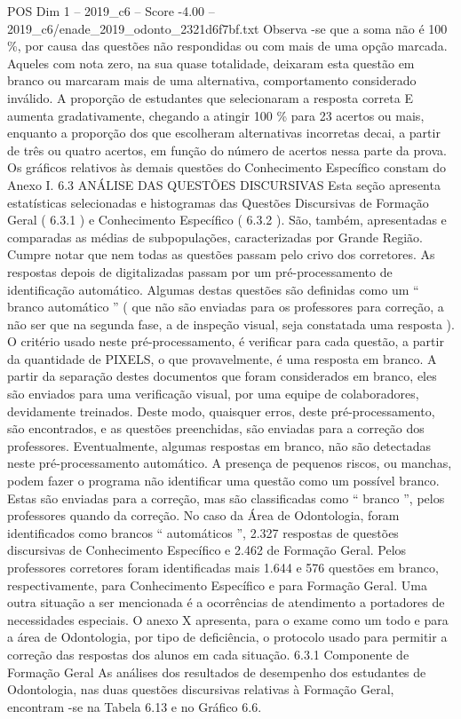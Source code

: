 \begin{textsample}{POS Dim 1 – 2019\_c6 – Score -4.00 – 2019\_c6/enade\_2019\_odonto\_2321d6f7bf.txt}
Observa -se que a soma não é 100 \%, por causa das questões não respondidas ou com mais de uma opção marcada.
Aqueles com nota zero, na sua quase totalidade, deixaram esta questão em branco ou marcaram mais de uma alternativa, comportamento considerado inválido.
A proporção de estudantes que selecionaram a resposta correta E aumenta gradativamente, chegando a atingir 100 \% para 23 acertos ou mais, enquanto a proporção dos que escolheram alternativas incorretas decai, a partir de três ou quatro acertos, em função do número de acertos nessa parte da prova.
Os gráficos relativos às demais questões do Conhecimento Específico constam do Anexo I. 6.3 ANÁLISE DAS QUESTÕES DISCURSIVAS Esta seção apresenta estatísticas selecionadas e histogramas das Questões Discursivas de Formação Geral ( 6.3.1 ) e Conhecimento Específico ( 6.3.2 ).
São, também, apresentadas e comparadas as médias de subpopulações, caracterizadas por Grande Região.
Cumpre notar que nem todas as questões passam pelo crivo dos corretores.
As respostas depois de digitalizadas passam por um pré-processamento de identificação automático.
Algumas destas questões são definidas como um “ branco automático ” ( que não são enviadas para os professores para correção, a não ser que na segunda fase, a de inspeção visual, seja constatada uma resposta ).
O critério usado neste pré-processamento, é verificar para cada questão, a partir da quantidade de PIXELS, o que provavelmente, é uma resposta em branco.
A partir da separação destes documentos que foram considerados em branco, eles são enviados para uma verificação visual, por uma equipe de colaboradores, devidamente treinados.
Deste modo, quaisquer erros, deste pré-processamento, são encontrados, e as questões preenchidas, são enviadas para a correção dos professores.
Eventualmente, algumas respostas em branco, não são detectadas neste pré-processamento automático.
A presença de pequenos riscos, ou manchas, podem fazer o programa não identificar uma questão como um possível branco.
Estas são enviadas para a correção, mas são classificadas como “ branco ”, pelos professores quando da correção.
No caso da Área de Odontologia, foram identificados como brancos “ automáticos ”, 2.327 respostas de questões discursivas de Conhecimento Específico e 2.462 de Formação Geral.
Pelos professores corretores foram identificadas mais 1.644 e 576 questões em branco, respectivamente, para Conhecimento Específico e para Formação Geral.
Uma outra situação a ser mencionada é a ocorrências de atendimento a portadores de necessidades especiais.
O anexo X apresenta, para o exame como um todo e para a área de Odontologia, por tipo de deficiência, o protocolo usado para permitir a correção das respostas dos alunos em cada situação. 6.3.1 Componente de Formação Geral As análises dos resultados de desempenho dos estudantes de Odontologia, nas duas questões discursivas relativas à Formação Geral, encontram -se na Tabela 6.13 e no Gráfico 6.6.

\end{textsample}
